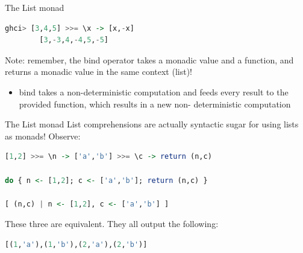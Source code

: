 \documentclass{beamer}
\begin{document}
\begin{frame}[fragile]{The List monad}
    \begin{minipage}{\linewidth} \hspace{1cm}
    \begin{lstlisting}[language=haskell, numbers=none, frame=none]
        ghci> [3,4,5] >>= \x -> [x,-x]
        [3,-3,4,-4,5,-5]
    \end{lstlisting}
    \end{minipage} \hspace{1cm}

    Note: remember, the bind operator takes a monadic value and a function,
    and returns a monadic value in the same context (list)!

    \bigbreak
    \begin{itemize}
        \item bind takes a non-deterministic computation and feeds
              every result to the provided function, which results
              in a new non- deterministic computation
    \end{itemize}
\end{frame}

\begin{frame}[fragile]{The List monad}
    List comprehensions are actually syntactic sugar for using lists as
    monads! Observe:

    \begin{minipage}{\linewidth} \hspace{1cm}
    \begin{lstlisting}[language=haskell, numbers=none, frame=none]
[1,2] >>= \n -> ['a','b'] >>= \c -> return (n,c)

do { n <- [1,2]; c <- ['a','b']; return (n,c) }

[ (n,c) | n <- [1,2], c <- ['a','b'] ]
    \end{lstlisting}
    \end{minipage} \hspace{1cm}

    These three are equivalent. They all output the following:

    \begin{minipage}{\linewidth} \hspace{1cm}
    \begin{lstlisting}[language=haskell, numbers=none, frame=none]
        [(1,'a'),(1,'b'),(2,'a'),(2,'b')]
    \end{lstlisting}
    \end{minipage} \hspace{1cm}
\end{frame}
\end{document}
